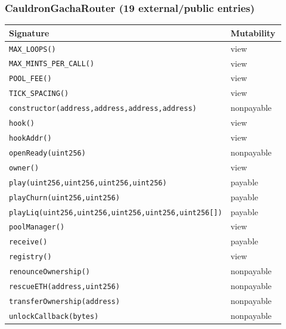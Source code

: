 \subsubsection*{CauldronGachaRouter \;\normalfont\small(19 external/public entries)}
\begin{longtable}{@{}p{0.62\linewidth}p{0.30\linewidth}@{}}
\toprule \textbf{Signature} & \textbf{Mutability} \\ \midrule \endhead
\texttt{\scriptsize MAX\_LOOPS()} & view \\
\texttt{\scriptsize MAX\_MINTS\_PER\_CALL()} & view \\
\texttt{\scriptsize POOL\_FEE()} & view \\
\texttt{\scriptsize TICK\_SPACING()} & view \\
\texttt{\scriptsize constructor(address,address,address,address)} & nonpayable \\
\texttt{\scriptsize hook()} & view \\
\texttt{\scriptsize hookAddr()} & view \\
\texttt{\scriptsize openReady(uint256)} & nonpayable \\
\texttt{\scriptsize owner()} & view \\
\texttt{\scriptsize play(uint256,uint256,uint256,uint256)} & payable \\
\texttt{\scriptsize playChurn(uint256,uint256)} & payable \\
\texttt{\scriptsize playLiq(uint256,uint256,uint256,uint256,uint256[])} & payable \\
\texttt{\scriptsize poolManager()} & view \\
\texttt{\scriptsize receive()} & payable \\
\texttt{\scriptsize registry()} & view \\
\texttt{\scriptsize renounceOwnership()} & nonpayable \\
\texttt{\scriptsize rescueETH(address,uint256)} & nonpayable \\
\texttt{\scriptsize transferOwnership(address)} & nonpayable \\
\texttt{\scriptsize unlockCallback(bytes)} & nonpayable \\
\bottomrule\end{longtable}

